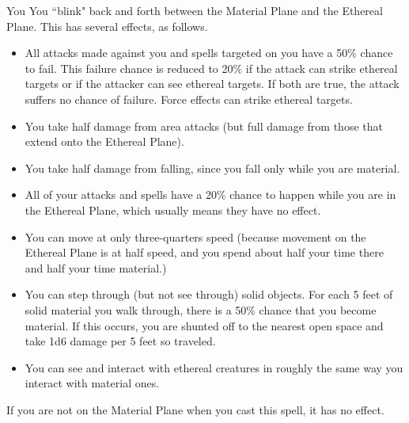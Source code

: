 \begin{spellheader}
    \spellrng{\rngpers}
    \spelldur{\durshort \dismissable}
\end{spellheader}
\begin{spelleffects}
    \begin{spelltarget}{You}
        \spelleffect You ``blink" back and forth between the Material Plane and the Ethereal Plane. This has several effects, as follows.
        \begin{itemize}
            \item All attacks made against you and spells targeted on you have a 50\% chance to fail. This failure chance is reduced to 20\% if the attack can strike ethereal targets or if the attacker can see ethereal targets. If both are true, the attack suffers no chance of failure. Force effects can strike ethereal targets.
            \item You take half damage from area attacks (but full damage from those that extend onto the Ethereal Plane).
            \item You take half damage from falling, since you fall only while you are material.
            \item All of your attacks and spells have a 20\% chance to happen while you are in the Ethereal Plane, which usually means they have no effect.
            \item You can move at only three-quarters speed (because movement on the Ethereal Plane is at half speed, and you spend about half your time there and half your time material.)
            \item You can step through (but not see through) solid objects. For each 5 feet of solid material you walk through, there is a 50\% chance that you become material. If this occurs, you are shunted off to the nearest open space and take 1d6 damage per 5 feet so traveled. 
            \item You can see and interact with ethereal creatures in roughly the same way you interact with material ones.
        \end{itemize}
    \end{spelltarget}
\end{spelleffects}
\begin{spellfooter}
    \spellnotes If you are not on the Material Plane when you cast this spell, it has no effect.
\end{spellfooter}

